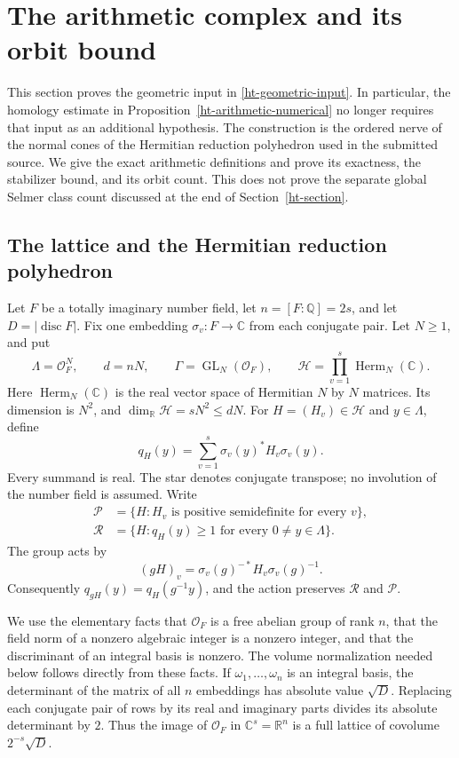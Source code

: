 \section{The arithmetic complex and its orbit bound}
\label{ac-section}

This section proves the geometric input in
\eqref{ht-geometric-input}.  In particular, the homology estimate in
Proposition~\ref{ht-arithmetic-numerical} no longer requires that input
as an additional hypothesis.  The construction is the ordered nerve
of the normal cones of the Hermitian reduction polyhedron used in
the submitted source\cite{alpo-uniform-source}.  We give the exact
arithmetic definitions and prove its exactness, the stabilizer bound,
and its orbit count.  This does not prove the separate global Selmer
class count discussed at the end of Section~\ref{ht-section}.

\subsection{The lattice and the Hermitian reduction polyhedron}

Let $F$ be a totally imaginary number field, let
$n=[F:\mathbb Q]=2s$, and let
$D=|\operatorname{disc}F|$.  Fix one embedding
$\sigma_v:F\longrightarrow\mathbb C$ from each conjugate pair.
Let $N\ge1$, and put
\[
 \Lambda=\mathcal O_F^N,\qquad
 d=nN,\qquad
 \Gamma=\operatorname{GL}_N(\mathcal O_F),\qquad
 \mathcal H=\prod_{v=1}^s\operatorname{Herm}_N(\mathbb C).
\]
Here $\operatorname{Herm}_N(\mathbb C)$ is the real vector space of
Hermitian $N$ by $N$ matrices.  Its dimension is $N^2$, and
$\dim_{\mathbb R}\mathcal H=sN^2\le dN$.  For $H=(H_v)\in\mathcal H$
and $y\in\Lambda$, define
\[
 q_H(y)=\sum_{v=1}^s \sigma_v(y)^*H_v\sigma_v(y).
\]
Every summand is real.  The star denotes conjugate transpose;
no involution of the number field is assumed.
Write
\[
 \begin{aligned}
 \mathcal P&=\{H:H_v\text{ is positive semidefinite for every }v\},\\
 \mathcal R&=\{H:q_H(y)\ge1\text{ for every }0\ne y\in\Lambda\}.
 \end{aligned}
 \tag{AC1}
\]
The group acts by
\[
 (gH)_v=\sigma_v(g)^{-*}H_v\sigma_v(g)^{-1}.
 \tag{AC2}
\]
Consequently $q_{gH}(y)=q_H(g^{-1}y)$, and the action preserves
$\mathcal R$ and $\mathcal P$.

We use the elementary facts that $\mathcal O_F$ is a free abelian
group of rank $n$, that the field norm of a nonzero algebraic integer
is a nonzero integer, and that the discriminant of an integral basis
is nonzero.  The volume normalization needed below follows directly
from these facts.  If $\omega_1,\ldots,\omega_n$ is an integral basis,
the determinant of the matrix of all $n$ embeddings has absolute
value $\sqrt D$.  Replacing each conjugate pair of rows by its real
and imaginary parts divides its absolute determinant by $2$.
Thus the image of $\mathcal O_F$ in $\mathbb C^s=\mathbb R^n$
is a full lattice of covolume $2^{-s}\sqrt D$.


